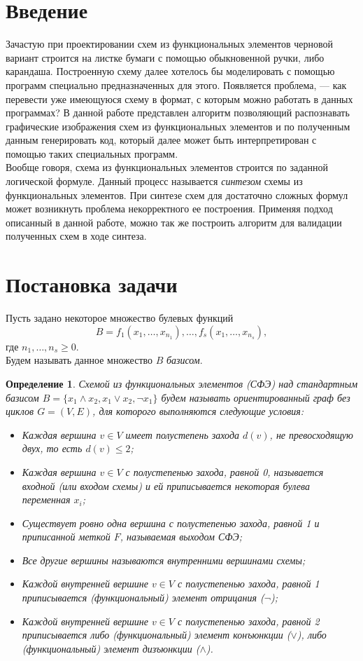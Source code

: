 \documentclass[makeidx, a4paper, 14pt]{extarticle}
\newtheorem{definition}{Определение}
\begin{document}
\tableofcontents

\section{Введение}
Зачастую при проектировании схем из функциональных элементов черновой вариант строится на листке бумаги с помощью обыкновенной ручки, либо карандаша.
Построенную схему далее хотелось бы моделировать с помощью программ специально предназначенных для этого. Появляется проблема, --- как перевести уже
имеющуюся схему в формат, с которым можно работать в данных программах? В данной работе представлен алгоритм позволяющий распознавать графические изображения
схем из функциональных элементов и по полученным данным генерировать код, который далее может быть интерпретирован с помощью таких специальных программ. \\
Вообще говоря, схема из функциональных элементов строится по заданной логической формуле. Данный процесс называется \emph{синтезом} схемы из функциональных элементов.
При синтезе схем для достаточно сложных формул может возникнуть проблема некорректного ее построения. Применяя подход описанный в данной работе, можно так же построить
алгоритм для валидации полученных схем в ходе синтеза.

\section{Постановка задачи}
Пусть задано некоторое множество булевых функций \[{B = {f_1(x_1, \dots, x_{n_1}), \dots, f_s(x_1, \dots, x_{n_s})}}, \]
где $n_1, \dots, n_s \ge 0$. \\ Будем называть данное множество $B$ \emph{базисом}.

\begin{definition}
    Схемой из функциональных элементов (СФЭ) над стандартным базисом ${B = \{x_1 \wedge x_2, x_1 \vee x_2, \neg{x_1}\}}$
    будем называть ориентированный граф без циклов ${G=(V, E)}$, для которого выполняются следующие условия:
    \begin{itemize}
        \item Каждая вершина $v \in V$ имеет полустепень захода $d(v)$, не превосходящую двух, то есть ${d(v) \le 2}$;
        \item Каждая вершина $v \in V$ с полустепенью захода, равной 0, называется входной (или входом схемы) и ей приписывается некоторая булева переменная $x_i$;
        \item Существует ровно одна вершина с полустепенью захода, равной 1 и приписанной меткой $F$, называемая выходом СФЭ;
        \item Все другие вершины называются внутренними вершинами схемы;
        \item Каждой внутренней вершине $v \in V$ с полустепенью захода, равной 1 приписывается (функциональный) элемент отрицания ($\neg$);
        \item Каждой внутренней вершине $v \in V$ с полустепенью захода, равной 2 приписывается либо (функциональный) элемент конъюнкции ($\vee$),
        либо (функциональный) элемент дизъюнкции ($\wedge$).
    \end{itemize}
\end{definition}
\end{document}
